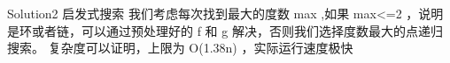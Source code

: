 {}\markdownRendererInterblockSeparator
{}\markdownRendererDollarSign{} Solution2 \markdownRendererDollarSign{} 启发式搜索\markdownRendererParagraphSeparator
{}我们考虑每次找到最大的度数\markdownRendererDollarSign{} max\markdownRendererSoftLineBreak
{}\markdownRendererDollarSign{},如果\markdownRendererDollarSign{} max<=2 \markdownRendererDollarSign{}，说明是环或者链，可以通过预处理好的\markdownRendererDollarSign{} f \markdownRendererDollarSign{}和\markdownRendererDollarSign{} g \markdownRendererDollarSign{}解决，否则我们选择度数最大的点递归搜索。\markdownRendererParagraphSeparator
{}复杂度可以证明，上限为\markdownRendererDollarSign{} O(\markdownRendererLeftBrace{}1.38\markdownRendererRightBrace{}\markdownRendererCircumflex{}\markdownRendererLeftBrace{}n\markdownRendererRightBrace{}) \markdownRendererDollarSign{}，实际运行速度极快\markdownRendererInterblockSeparator
{}
\markdownRendererSectionEnd 
\markdownRendererSectionEnd \markdownRendererDocumentEnd